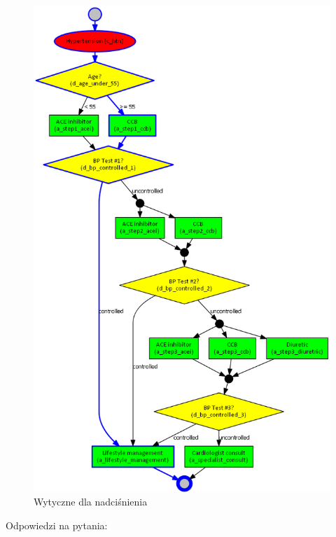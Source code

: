 \begin{figure}[H]
\centering
\includegraphics[scale=0.5]{img/htn-ver-3.png}
\caption{Wytyczne dla nadciśnienia}
\label{fig:htn}
\end{figure}
\newpage
\noindent Odpowiedzi na pytania:
